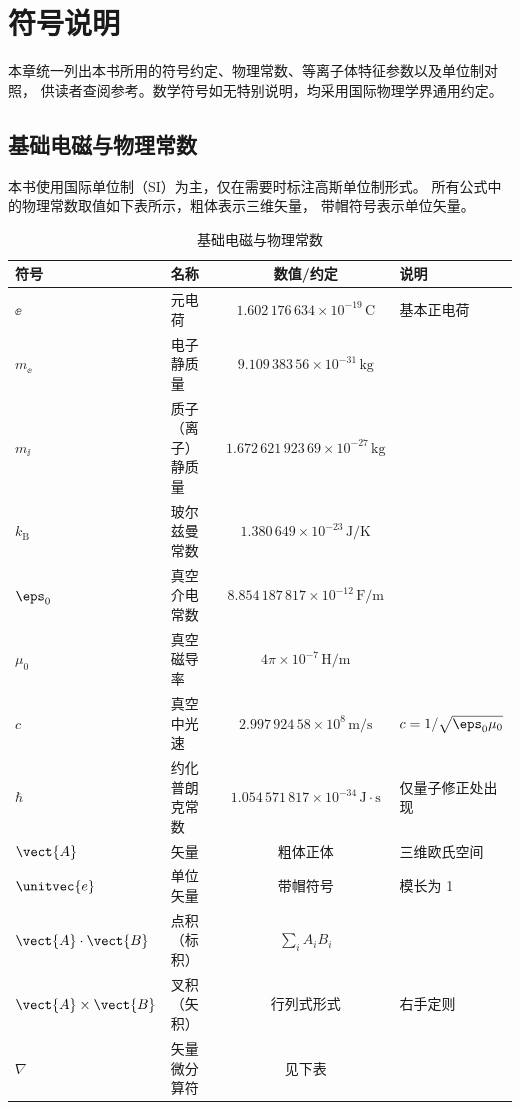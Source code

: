 
\chapter*{符号说明}

本章统一列出本书所用的符号约定、物理常数、等离子体特征参数以及单位制对照，
供读者查阅参考。数学符号如无特别说明，均采用国际物理学界通用约定。


\section*{基础电磁与物理常数}

本书使用国际单位制（SI）为主，仅在需要时标注高斯单位制形式。
所有公式中的物理常数取值如下表所示，粗体表示三维矢量，
带帽符号表示单位矢量。

\begin{table}[htbp]
\centering
\caption{基础电磁与物理常数}
\begin{tabular}{@{}llcl@{}}
\toprule
\textbf{符号} & \textbf{名称} & \textbf{数值/约定} & \textbf{说明} \\
\midrule
$\ee$ & 元电荷 & $1.602\,176\,634\times 10^{-19}\,\mathrm{C}$ & 基本正电荷 \\
$m_\ee$ & 电子静质量 & $9.109\,383\,56\times 10^{-31}\,\mathrm{kg}$ & \\
$m_\ii$ & 质子（离子）静质量 & $1.672\,621\,923\,69\times 10^{-27}\,\mathrm{kg}$ & \\
$k_\mathrm{B}$ & 玻尔兹曼常数 & $1.380\,649\times 10^{-23}\,\mathrm{J/K}$ & \\
$\eps_0$ & 真空介电常数 & $8.854\,187\,817\times 10^{-12}\,\mathrm{F/m}$ & \\
$\mu_0$ & 真空磁导率 & $4\pi\times 10^{-7}\,\mathrm{H/m}$ & \\
$c$ & 真空中光速 & $2.997\,924\,58\times 10^{8}\,\mathrm{m/s}$ & $c=1/\sqrt{\eps_0\mu_0}$ \\
$\hbar$ & 约化普朗克常数 & $1.054\,571\,817\times 10^{-34}\,\mathrm{J\cdot s}$ & 仅量子修正处出现 \\
\midrule
$\vect{A}$ & 矢量 & 粗体正体 & 三维欧氏空间 \\
$\unitvec{e}$ & 单位矢量 & 带帽符号 & 模长为 1 \\
$\vect{A}\cdot\vect{B}$ & 点积（标积） & $\sum_i A_i B_i$ & \\
$\vect{A}\times\vect{B}$ & 叉积（矢积） & 行列式形式 & 右手定则 \\
$\nabla$ & 矢量微分算符 & 见下表 & \\
\bottomrule
\end{tabular}
\end{table}


